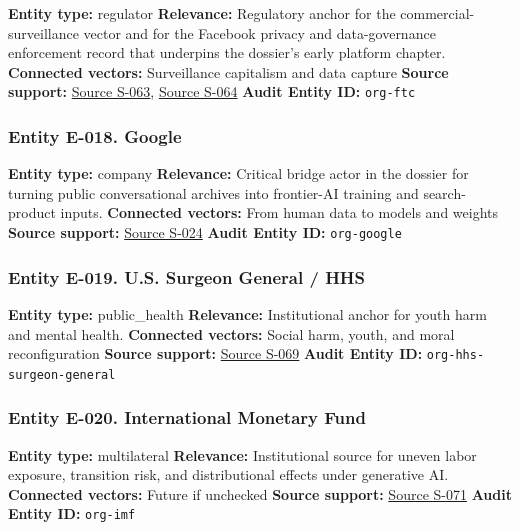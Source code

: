 \documentclass[
  american,
  11pt,
  letterpaper,
]{article}
\begin{document}
\textbf{Entity type:} regulator \textbf{Relevance:} Regulatory anchor
for the commercial-surveillance vector and for the Facebook privacy and
data-governance enforcement record that underpins the dossier's early
platform chapter. \textbf{Connected vectors:} Surveillance capitalism
and data capture \textbf{Source support:}
\hyperref[source-s-063-a-look-behind-the-screens-examining-the-data-practices-of-social-media-and-video-streaming-services]{Source
S-063},
\hyperref[source-s-064-ftc-imposes-5-billion-penalty-and-sweeping-new-privacy-restrictions-on-facebook]{Source
S-064} \textbf{Audit Entity ID:} \texttt{org-ftc}

\subsubsection{Entity E-018. Google}\label{entity-e-018-google}

\textbf{Entity type:} company \textbf{Relevance:} Critical bridge actor
in the dossier for turning public conversational archives into
frontier-AI training and search-product inputs. \textbf{Connected
vectors:} From human data to models and weights \textbf{Source support:}
\hyperref[source-s-024-reddit-strikes-60m-deal-allowing-google-to-train-ai-models-on-its-posts-unveils-ipo-plans]{Source
S-024} \textbf{Audit Entity ID:} \texttt{org-google}

\subsubsection{Entity E-019. U.S. Surgeon General /
HHS}\label{entity-e-019-u-s-surgeon-general-hhs}

\textbf{Entity type:} public\_health \textbf{Relevance:} Institutional
anchor for youth harm and mental health. \textbf{Connected vectors:}
Social harm, youth, and moral reconfiguration \textbf{Source support:}
\hyperref[source-s-069-social-media-and-youth-mental-health-the-u-s-surgeon-general-s-advisory]{Source
S-069} \textbf{Audit Entity ID:} \texttt{org-hhs-surgeon-general}

\subsubsection{Entity E-020. International Monetary
Fund}\label{entity-e-020-international-monetary-fund}

\textbf{Entity type:} multilateral \textbf{Relevance:} Institutional
source for uneven labor exposure, transition risk, and distributional
effects under generative AI. \textbf{Connected vectors:} Future if
unchecked \textbf{Source support:}
\hyperref[source-s-071-gen-ai-artificial-intelligence-and-the-future-of-work]{Source
S-071} \textbf{Audit Entity ID:} \texttt{org-imf}
\end{document}
